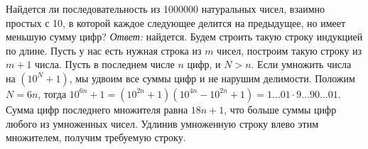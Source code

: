 \problem
Найдется ли последовательность из 1000000 натуральных чисел, взаимно простых с
10, в которой каждое следующее делится на предыдущее, но имеет меньшую сумму
цифр?
\solution
\emph{Ответ:} найдется.
Будем строить такую строку индукцией по длине.
Пусть у нас есть нужная строка из $m$ чисел, построим такую строку из $m + 1$
числа.
Пусть в последнем числе $n$ цифр, и $N > n$.
Если умножить числа на $(10^N + 1)$, мы удвоим все суммы цифр и не нарушим
делимости.
Положим $N = 6 n$, тогда
\(
    10^{6 n} + 1
=
    (10^{2n} + 1) (10^{4n} - 10^{2n} + 1)
=
    1\ldots01 \cdot 9\ldots90\ldots01
\).
Сумма цифр последнего множителя равна $18 n + 1$, что больше суммы цифр любого
из умноженных чисел.
Удлинив умноженную строку влево этим множителем, получим требуемую строку.
\endproblem
